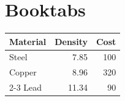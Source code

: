\documentclass{article}
\begin{document}
\section{Booktabs}
\begin{tabular}{lrr}
\toprule
Material & Density & Cost \\
\midrule
Steel  & 7.85  & 100 \\
Copper & 8.96  & 320 \\
\cmidrule(lr){2-3}
Lead   & 11.34 & 90  \\
\bottomrule
\end{tabular}
\end{document}
